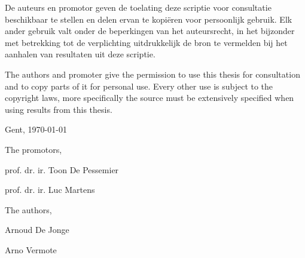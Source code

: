 

\par\vspace*{\fill}

De auteurs en promotor geven de toelating deze scriptie voor consultatie beschikbaar te stellen en delen ervan te kopi\"eren voor persoonlijk gebruik. Elk ander gebruik valt onder de beperkingen van het auteursrecht, in het bijzonder met betrekking tot de verplichting uitdrukkelijk de bron te vermelden bij het aanhalen van resultaten uit deze scriptie.

The authors and promoter give the permission to use this thesis for consultation and to copy parts of it for personal use. Every other use is subject to the copyright laws, more specifically the source must be extensively specified when using results from this thesis.

\vspace{1cm}

Gent, \today %

\vspace{1cm}

\begin{minipage}[t][4cm][t]{0.5\textwidth}
\raggedright
The promotors,

\vspace{2.5cm}

prof. dr. ir. Toon De Pessemier

prof. dr. ir. Luc Martens
\end{minipage}
\begin{minipage}[t][4cm][t]{0.48\textwidth}
\raggedright
The authors,

\vspace{2.5cm}

Arnoud De Jonge

Arno Vermote
\end{minipage}

\thispagestyle{empty}

